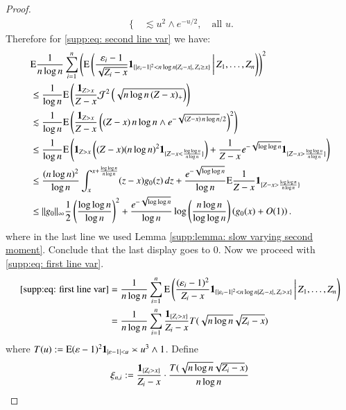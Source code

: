 \begin{proof}
\begin{align*}
\begin{cases}
		\end{cases}\lesssim u^2 \wedge e^{-u/2}, \quad \text{all } u.
		\end{align*}
		Therefore for \eqref{supp:eq: second line var} we have:
		\begin{align*}
			&\mathrm{E} \frac{1}{n \log n} \sum_{i=1}^n \left( \mathrm{E} \left( \frac{\varepsilon_i -1}{\sqrt{Z_i - x}} \mathbf{1}_{\{ |\varepsilon_i -1|^2 < n \log n \mid Z_i - x|, \, Z_i \geq x \}} \, \bigg| \, Z_1,\ldots,Z_n \right) \right)^2 \\
			&\leq \frac{1}{\log n} \mathrm{E} \left( \frac{\mathbf{1}_{Z > x}}{Z-x} \mathcal{J}^2 \left( \sqrt{n \log n  \, (Z-x)_+}  \right) \right) \\
			&\lesssim \frac{1}{\log n} \mathrm{E} \left( \frac{\mathbf{1}_{Z > x}}{Z-x} \left( (Z-x) \, n \log n \wedge e^{-\sqrt{(Z-x) \, n \log n}/2} \right)^2 \right) \\
			&\leq \frac{1}{\log n} \mathrm{E} \left( \mathbf{1}_{Z > x} \left( (Z-x) (n \log n)^2 \mathbf{1}_{\{ Z-x < \frac{\log \log n}{n \log n} \}} \right)  + \frac{1}{Z-x} e^{-\sqrt{\log \log n}} \mathbf{1}_{\{ Z-x > \frac{\log \log n}{n \log n} \}} \right) \\
			&\leq \frac{(n \log n)^2}{\log n} \int_{x}^{x + \frac{\log \log n}{n \log n}} (z-x) g_0(z) \, dz 
			+ \frac{e^{-\sqrt{\log \log n}}}{\log n} \mathrm{E} \frac{1}{Z-x} \mathbf{1}_{\{ Z-x > \frac{\log \log n}{n \log n} \}} \\
			&\leq \| g_0 \|_{\infty} \frac{1}{2} \left( \frac{\log \log n}{\log n} \right)^2 
			+ \frac{e^{-\sqrt{\log \log n}}}{\log n} \log \left( \frac{n \log n}{\log \log n} \right) 
			\left( g_0(x) + O(1) \right).
		\end{align*}
		where in the last line we used Lemma \ref{supp:lemma: slow varying second moment}. Conclude that the last display goes to 0. Now we proceed with \eqref{supp:eq: first line var}. 
		\begin{align*}
			\eqref{supp:eq: first line var} &= \frac{1}{n \log n} \sum_{i=1}^n \mathrm{E} \left( \frac{(\varepsilon_i - 1)^2}{Z_i - x} \mathbf{1}_{\{|\varepsilon_i - 1|^2 < n \log n |Z_i - x|, \, Z_i > x\}} \, \bigg| \, Z_1,\ldots,Z_n \right) \\
			&= \frac{1}{n \log n} \sum_{i=1}^n \frac{\mathbf{1}_{\{Z_i > x\}}}{Z_i - x} T(\sqrt{n \log n} \sqrt{Z_i - x})
			\end{align*}
			where $T(u) := \mathrm{E} (\varepsilon - 1)^2 \mathbf{1}_{|\varepsilon - 1| < u} \asymp u^3 \land 1$. Define
			\[
			\xi_{n,i} := \frac{\mathbf{1}_{\{Z_i > x\}}}{Z_i - x} \cdot \frac{T(\sqrt{n \log n} \sqrt{Z_i - x})}{n \log n}
			\]

\end{proof}
